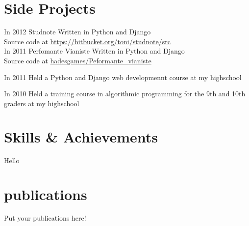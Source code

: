 \documentclass[]{friggeri-cv}
\begin{document}
\section{Side Projects}

\begin{entrylist}
  \entry
  {In 2012} 
  {}
  {Studnote}
  {}
  {
    Written in Python and Django \\ 
    Source code at \href{http://bitbucket.org/toni/studnote/src}{https://bitbucket.org/toni/studnote/src} \\
  }
  \entry
  {In 2011}
  {}
  {Perfomante Vianiste}
  {}
  {
    Written in Python and Django \\
    Source code at \href{https://github.com/hadesgames/Performante\_vianiste}{hadesgames/Peformante\_vianiste}
  }

  \entry
  {In 2011}
  {}
  {Held a Python and Django web developmennt course at my highschool}
  {}
  {}

  \entry
  {In 2010}
  {}
  {Held a training course in algorithmic programming for the 9th and 10th graders at my highschool}
  {}
  {}
\end{entrylist}

\section{Skills \& Achievements}
Hello
\section{publications}

Put your publications here!

% 
\end{document}
